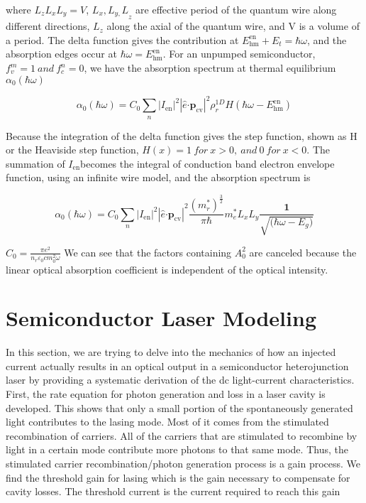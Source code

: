 where \(L_{z}L_{x}L_{y} = V\), \({L_{x},L_{y,}L}_{z}\) are effective
period of the quantum wire along different directions, \(L_{z}\) along
the axial of the quantum wire, and V is a volume of a period. The delta
function gives the contribution at
\(E_{\text{hm}}^{\text{en}} + E_{t} = \hbar\omega\), and the
absorption edges occur at \(\hbar\omega = E_{\text{hm}}^{\text{en}}\).
For an unpumped semiconductor, \(f_{v}^{m} = 1\ and\ f_{c}^{n} = 0\), we
have the absorption spectrum at thermal equilibrium
\(\alpha_{0}\left( \hbar\omega \right)\)

\begin{equation}
\alpha_{0}\left( \hbar\omega \right) = C_{0}\sum_{n}^{}\left| I_{\text{en}} \right|^{2}\left| \hat{e}\bm{\cdot}\bm{p}_{\text{cv}} \right|^{2}\rho_{r}^{1D}H(\hbar\omega - E_{\text{hm}}^{\text{en}})
\end{equation}

Because the integration of the delta function gives the step function,
shown as H or the Heaviside step function,
\(H\left( x \right) = 1\ for\ x > 0,\ and\ 0\ for\ x < 0\). The
summation of \(I_{\text{en}}\)becomes the integral of conduction band
electron envelope function, using an infinite wire model, and the
absorption spectrum is

\begin{equation}
\alpha_{0}\left( \hbar\omega \right) = C_{0}{\sum_{n}^{}\left| I_{\text{en}} \right|^{2}\left| \hat{e}\bm{\cdot}\bm{p}_{\text{cv}} \right|}^{2}\frac{\left( m_{r}^{*} \right)^{\frac{3}{2}}}{\pi\hbar}m_{e}^{*}L_{x}L_{y}\frac{\bm{1}}{\sqrt{\bm{(}\hbar\omega - E_{g}\bm{)}}}
\end{equation}

\(C_{0} = \frac{\pi e^{2}}{n_{r}\varepsilon_{0}cm_{0}^{2}\omega}\)
We can see that the factors containing \(A_{0}^{2}\) are canceled
because the linear optical absorption coefficient is independent of the
optical intensity.

\chapter{Semiconductor Laser Modeling}
\label{sec:model}

In this section, we are trying to delve into the mechanics of how an injected
current actually results in an optical output in a semiconductor heterojunction
laser by providing a systematic derivation of the dc light-current
characteristics. First, the rate equation for photon generation and loss in a
laser cavity is developed. This shows that only a small portion of the
spontaneously generated light contributes to the lasing mode. Most of it comes
from the stimulated recombination of carriers. All of the carriers that are
stimulated to recombine by light in a certain mode contribute more photons to
that same mode. Thus, the stimulated carrier recombination/photon generation
process is a gain process. We find the threshold gain for lasing which is the
gain necessary to compensate for cavity losses. The threshold current is the
current required to reach this gain 

